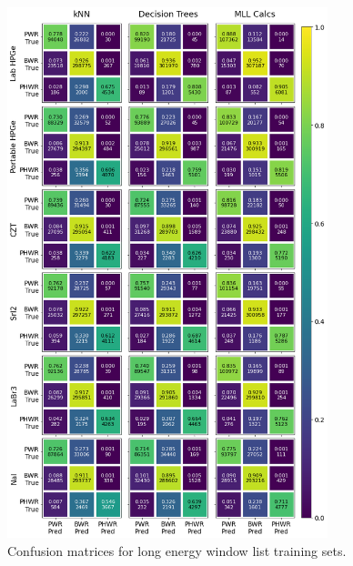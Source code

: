 \begin{figure}[!htb]
  \centering
  \includegraphics[width=0.83\textwidth]{./chapters/exp2/confusion_matrix_6dets_long.png}
  \caption{Confusion matrices for long energy window list training sets.}
  \label{fig:cm_long}
\end{figure}

